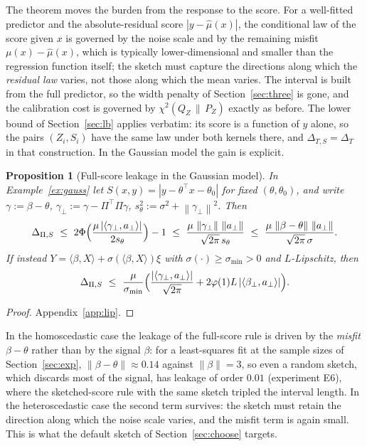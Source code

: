 \documentclass[11pt,a4paper]{article}
\newcommand{\chisqZ}{\chi^2(Q_Z\,\|\,P_Z)}
\newcommand{\norm}[1]{\left\|#1\right\|}
\theoremstyle{plain}
\newtheorem{proposition}[theorem]{Proposition}
\theoremstyle{definition}
\theoremstyle{remark}
\begin{document}
The theorem moves the burden from the response to the score. For a well-fitted predictor and the absolute-residual score $|y-\hat\mu(x)|$, the conditional law of the score given $x$ is governed by the noise scale and by the remaining misfit $\mu(x)-\hat\mu(x)$, which is typically lower-dimensional and smaller than the regression function itself; the sketch must capture the directions along which the \emph{residual law} varies, not those along which the mean varies. The interval is built from the full predictor, so the width penalty of Section~\ref{sec:three} is gone, and the calibration cost is governed by $\chisqZ$ exactly as before. The lower bound of Section~\ref{sec:lb} applies verbatim: its score is a function of $y$ alone, so the pairs $(Z_i,S_i)$ have the same law under both kernels there, and $\Delta_{T,S}=\Delta_T$ in that construction. In the Gaussian model the gain is explicit.

\begin{proposition}[Full-score leakage in the Gaussian model]\label{prop:fullgauss}
In Example~\ref{ex:gauss} let $S(x,y)=|y-\theta^{\!\top}x-\theta_0|$ for fixed $(\theta,\theta_0)$, and write $\gamma:=\beta-\theta$, $\gamma_\perp:=\gamma-\Pi^{\!\top}\Pi\gamma$, $s_\theta^2:=\sigma^2+\norm{\gamma_\perp}^2$. Then
\[
\Delta_{\Pi,S}\ \le\ 2\Phi\Bigl(\frac{\mu\,|\langle\gamma_\perp,a_\perp\rangle|}{2s_\theta}\Bigr)-1\ \le\ \frac{\mu\,\norm{\gamma_\perp}\,\norm{a_\perp}}{\sqrt{2\pi}\,s_\theta}\ \le\ \frac{\mu\,\norm{\beta-\theta}\,\norm{a_\perp}}{\sqrt{2\pi}\,\sigma}.
\]
If instead $Y=\langle\beta,X\rangle+\sigma(\langle\beta,X\rangle)\xi$ with $\sigma(\cdot)\ge\sigma_{\min}>0$ and $L$-Lipschitz, then
\[
\Delta_{\Pi,S}\ \le\ \frac{\mu}{\sigma_{\min}}\Bigl(\frac{|\langle\gamma_\perp,a_\perp\rangle|}{\sqrt{2\pi}}+2\varphi(1)L\,|\langle\beta_\perp,a_\perp\rangle|\Bigr).
\]
\end{proposition}
\begin{proof}
Appendix~\ref{app:lip}.
\end{proof}

In the homoscedastic case the leakage of the full-score rule is driven by the \emph{misfit} $\beta-\theta$ rather than by the signal $\beta$: for a least-squares fit at the sample sizes of Section~\ref{sec:exp}, $\norm{\beta-\theta}\approx0.14$ against $\norm\beta=3$, so even a random sketch, which discards most of the signal, has leakage of order $0.01$ (experiment E6), where the sketched-score rule with the same sketch tripled the interval length. In the heteroscedastic case the second term survives: the sketch must retain the direction along which the noise scale varies, and the misfit term is again small. This is what the default sketch of Section~\ref{sec:choose} targets.
\end{document}
